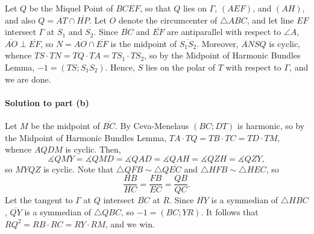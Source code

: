 Let $Q$ be the Miquel Point of $BCEF$, so that $Q$ lies on $\Gamma$, $(AEF)$, and $(AH)$, and also $Q=\overline{AT}\cap\overline{HP}$. Let $O$ denote the circumcenter of $\triangle ABC$, and let line $EF$ intersect $\Gamma$ at $S_1$ and $S_2$. Since $\overline{BC}$ and $\overline{EF}$ are antiparallel with respect to $\angle A$, $\overline{AO}\perp\overline{EF}$, so $N=\overline{AO}\cap\overline{EF}$ is the midpoint of $\overline{S_1S_2}$. Moreover, $ANSQ$ is cyclic, whence $TS\cdot TN=TQ\cdot TA=TS_1\cdot TS_2$, so by the Midpoint of Harmonic Bundles Lemma, $-1=(TS;S_1S_2)$. Hence, $S$ lies on the polar of $T$ with respect to $\Gamma$, and we are done.

\paragraph{Solution to part (b)}     Let $M$ be the midpoint of $\overline{BC}$. By Ceva-Menelaus $(BC;DT)$ is harmonic, so by the Midpoint of Harmonic Bundles Lemma, $TA\cdot TQ=TB\cdot TC=TD\cdot TM$, whence $AQDM$ is cyclic. Then, \[\measuredangle QMY=\measuredangle QMD=\measuredangle QAD=\measuredangle QAH=\measuredangle QZH=\measuredangle QZY,\]
so $MYQZ$ is cyclic. Note that $\triangle QFB\sim\triangle QEC$ and $\triangle HFB\sim\triangle HEC$, so \[\frac{HB}{HC}=\frac{FB}{EC}=\frac{QB}{QC}.\]
Let the tangent to $\Gamma$ at $Q$ intersect $\overline{BC}$ at $R$. Since $\overline{HY}$ is a symmedian of $\triangle HBC$, $\overline{QY}$ is a symmedian of $\triangle QBC$, so $-1=(BC;YR)$. It follows that $RQ^2=RB\cdot RC=RY\cdot RM$, and we win.

